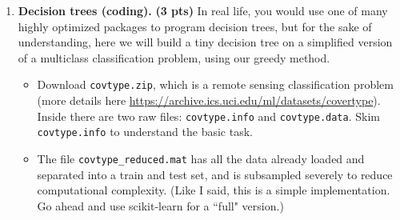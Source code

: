 \documentclass{article}
\newcommand{\bE}{\mathbb E}
\newcommand{\showpoints}[1]{\textbf{(#1 pts)}}
\begin{document}
\begin{enumerate}
\begin{enumerate}
\begin{enumerate}
\item \showpoints{0.4} Compute the bias and variance of $x_{\mathrm{MAP}}$. 


\item \showpoints{0.3} Describe the behavior of the bias and variance of $x_{\mathrm{MAP}}$ as $m\to +\infty$.



\end{enumerate}



\item \showpoints{0.5}
A natural question to ask is, how to choose $\rho$? In general, we want $\rho$ to be big when our MLE estimate is not very powerful, either because $m$ is very small or the variance of $y_i$ is very big. On the other hand, if our prior $\bar x$ is very close to $x$, large $\rho$ can also help guide our guess. But while we can't in general know $\|x - \bar x\|$, we can try to make some statistical arguments over how $\rho$ should depend on $m$. 


Recall from lecture that 
\[
\mathrm{MSE} = \bE[(x-\hat x)^2] = B^2 + V.
\]
Show that by introducing a dummy variable $\beta = \frac{1}{1+\rho}$, that the MSE can be written as a convex function of $\beta$. Use this to find the $\rho$ that minimizes the MSE, as a function of $m$ and an error term   $\Delta = \bar x - x$.


\end{enumerate}




\item \textbf{Decision trees (coding).} \showpoints{3}  In real life, you would use one of many highly optimized packages to program decision trees, but for the sake of understanding, here we will build a tiny decision tree on a simplified version of a multiclass classification problem, using our greedy method. 

\begin{itemize}
\item Download \texttt{covtype.zip},  which is a remote sensing classification problem (more details here \url{https://archive.ics.uci.edu/ml/datasets/covertype}). Inside there are two raw files: \texttt{covtype.info} and \texttt{covtype.data}. Skim \texttt{covtype.info} to understand the basic task. 

\item The file \texttt{covtype\_reduced.mat} has all the data already loaded and separated into a train and test set, and is subsampled severely to reduce computational complexity. (Like I said, this is a simple implementation. Go ahead and use scikit-learn for a ``full" version.)


\end{itemize}
\end{enumerate}
\end{document}
